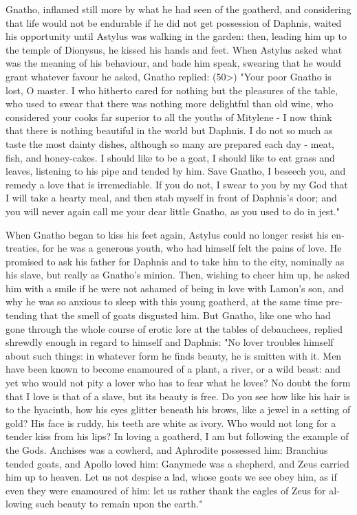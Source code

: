 \documentclass{book}
\begin{document}
\begin{pairs}
\begin{Rightside}
\begin{english}
  Gnatho, inflamed still more by what he had seen of the goatherd, and considering that life would not be endurable if he did not get possession of Daphnis, waited his opportunity until Astylus was walking in the garden: then, leading him up to the temple of Dionysus, he kissed his hands and feet.  When Astylus asked what was the meaning of his behaviour, and bade him speak, swearing that he would grant whatever favour he asked, Gnatho replied: (50>) "Your poor Gnatho is lost, O master.  I who hitherto cared for nothing but the pleasures of the table, who used to swear that there was nothing more delightful than old wine, who considered your cooks far superior to all the youths of Mitylene - I now think that there is nothing beautiful in the world but Daphnis.  I do not so much as taste the most dainty dishes, although so many are prepared each day - meat, fish, and honey-cakes.  I should like to be a goat, I should like to eat grass and leaves, listening to his pipe and tended by him.  Save Gnatho, I beseech you, and remedy a love that is irremediable.  If you do not, I swear to you by my God that I will take a hearty meal, and then stab myself in front of Daphnis's door; and you will never again call me your dear little Gnatho, as you used to do in jest."
\pend


  When Gnatho began to kiss his feet again, Astylus could no longer resist his entreaties, for he was a generous youth, who had himself felt the pains of love.  He promised to ask his father for Daphnis and to take him to the city, nominally as his slave, but really as Gnatho's minion.  Then, wishing to cheer him up, he asked him with a smile if he were not ashamed of being in love with Lamon's son, and why he was so anxious to sleep with this young goatherd, at the same time pretending that the smell of goats disgusted him.  But Gnatho, like one who had gone through the whole course of erotic lore at the tables of debauchees, replied shrewdly enough in regard to himself and Daphnis:  "No lover troubles himself about such things: in whatever form he finds beauty, he is smitten with it.  Men have been known to become enamoured of a plant, a river, or a wild beast: and yet who would not pity a lover who has to fear what he loves?  No doubt the form that I love is that of a slave, but its beauty is free.  Do you see how like his hair is to the hyacinth, how his eyes glitter beneath his brows, like a jewel in a setting of gold?  His face is ruddy, his teeth are white as ivory.  Who would not long for a tender kiss from his lips?  In loving a goatherd, I am but following the example of the Gods.  Anchises was a cowherd, and Aphrodite possessed him: Branchius tended goats, and Apollo loved him: Ganymede was a shepherd, and Zeus carried him up to heaven.  Let us not despise a lad, whose goats we see obey him, as if even they were enamoured of him: let us rather thank the eagles of Zeus for allowing such beauty to remain upon the earth."
\pend



\end{english}
\end{Rightside}
\end{pairs}
\end{document}

